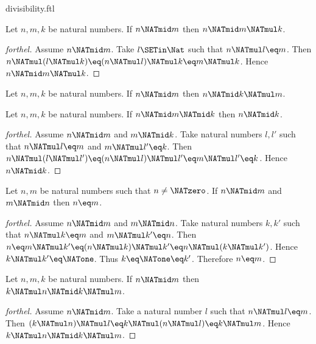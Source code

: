 \documentclass{stex}
\begin{document}
\begin{smodule}{divisibility.ftl}
\begin{proposition}[forthel,id=ARITHMETIC_07_7463519983239168]
  Let $n, m, k$ be natural numbers.
  If $n \NATmid m$ then $n \NATmid m \NATmul k$.
\end{proposition}
\begin{proof}[forthel]
  Assume $n \NATmid m$.
  Take $l \SETin \Nat$ such that $n \NATmul l \eq m$.
  Then $n \NATmul (l \NATmul k)
    \eq (n \NATmul l) \NATmul k
    \eq m \NATmul k$.
  Hence $n \NATmid m \NATmul k$.
\end{proof}

\begin{corollary}[forthel,id=ARITHMETIC_07_1588185794609152]
  Let $n, m, k$ be natural numbers.
  If $n \NATmid m$ then $n \NATmid k \NATmul m$.
\end{corollary}

\begin{proposition}[forthel,id=ARITHMETIC_07_7863858316181504]
  Let $n, m, k$ be natural numbers.
  If $n \NATmid m \NATmid k$ then $n \NATmid k$.
\end{proposition}
\begin{proof}[forthel]
  Assume $n \NATmid m$ and $m \NATmid k$.
  Take natural numbers $l,l'$ such that $n \NATmul l \eq m$ and $m \NATmul l' \eq k$.
  Then $n \NATmul (l \NATmul l')
    \eq (n \NATmul l) \NATmul l'
    \eq m \NATmul l'
    \eq k$.
  Hence $n \NATmid k$.
\end{proof}

\begin{proposition}[forthel,id=ARITHMETIC_07_4933275640397824]
  Let $n, m$ be natural numbers such that $n \neq \NATzero$.
  If $n \NATmid m$ and $m \NATmid n$ then $n \eq m$.
\end{proposition}
\begin{proof}[forthel]
  Assume $n \NATmid m$ and $m \NATmid n$.
  Take natural numbers $k,k'$ such that $n \NATmul k \eq m$ and $m \NATmul k' \eq n$.
  Then $n
    \eq m \NATmul k'
    \eq (n \NATmul k) \NATmul k'
    \eq n \NATmul (k \NATmul k')$.
  Hence $k \NATmul k' \eq \NATone$.
  Thus $k \eq \NATone \eq k'$.
  Therefore $n \eq m$.
\end{proof}

\begin{proposition}[forthel,id=ARITHMETIC_07_1283495225720832]
  Let $n, m, k$ be natural numbers.
  If $n \NATmid m$ then $k \NATmul n \NATmid k \NATmul m$.
\end{proposition}
\begin{proof}[forthel]
  Assume $n \NATmid m$.
  Take a natural number $l$ such that $n \NATmul l \eq m$.
  Then $(k \NATmul n) \NATmul l
    \eq k \NATmul (n \NATmul l)
    \eq k \NATmul m$.
  Hence $k \NATmul n \NATmid k \NATmul m$.
\end{proof}


\end{smodule}
\end{document}

